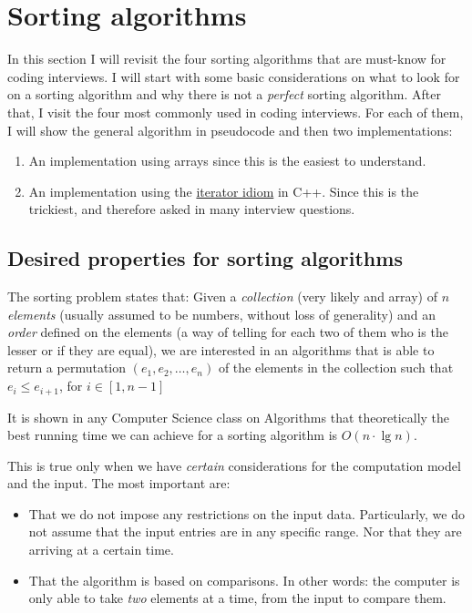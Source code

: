 \section{Sorting algorithms}

In this section I will revisit the four sorting algorithms that are must-know for coding interviews.
I will start with some basic considerations on what to look for on a sorting algorithm and why there is not a \emph{perfect} sorting algorithm.
After that, I visit the four most commonly used in coding interviews.
For each of them, I will show the general algorithm in pseudocode and then two implementations:
\begin{enumerate}
 \item An implementation using arrays since this is the easiest to understand.
 \item An implementation using the \href{https://en.wikibooks.org/wiki/More_C\%2B\%2B_Idioms/Iterator_Pair}{iterator idiom} in C++. Since this is the trickiest, and therefore asked in many interview questions.
\end{enumerate}

\subsection{Desired properties for sorting algorithms}

The sorting problem states that: Given a \emph{collection} (very likely and array) of $n$ \emph{elements} (usually assumed to be numbers, without loss of generality) and an \emph{order} defined on the elements (a way of telling for each two of them who is the lesser or if they are equal), we are interested in an algorithms that is able to return a permutation $(e_1, e_2, \ldots, e_n)$ of the elements in the collection such that $e_i \leq e_{i + 1}$, for $i \in [1, n-1]$

It is shown in any Computer Science class on Algorithms that theoretically the best running time we can achieve for a sorting algorithm is $O(n \cdot \lg n)$.

This is true only when we have \emph{certain} considerations for the computation model and the input. The most important are:

\begin{itemize}
 \item That we do not impose any restrictions on the input data. Particularly, we do not assume that the input entries are in any specific range. Nor that they are arriving at a certain time.
 \item That the algorithm is based on comparisons. In other words: the computer is only able to take \emph{two} elements at a time, from the input to compare them.
\end{itemize}

